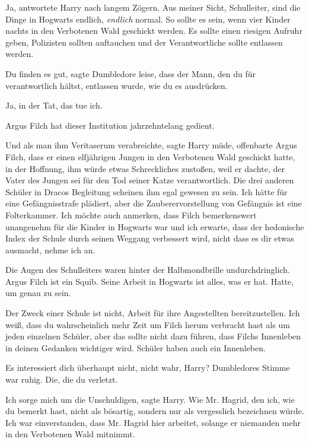 \glqq{}Ja\grqq{}, antwortete Harry nach langem Zögern. \glqq{}Aus meiner Sicht,
Schulleiter, sind die Dinge in Hogwarts endlich, \emph{endlich} normal. So
sollte es sein, wenn vier Kinder nachts in den Verbotenen Wald geschickt werden.
Es sollte einen riesigen Aufruhr geben, Polizisten sollten auftauchen und der
Verantwortliche sollte entlassen werden.\grqq{}

\glqq{}Du finden es gut\grqq{}, sagte Dumbledore leise, \glqq{}dass der Mann, den
du für verantwortlich hältst, entlassen wurde, wie du es ausdrücken.\grqq{}

\glqq{}Ja, in der Tat, das tue ich.\grqq{}

\glqq{}Argus Filch hat dieser Institution jahrzehntelang gedient.\grqq{}

\glqq{}Und als man ihm Veritaserum verabreichte\grqq{}, sagte Harry müde, \glqq{}
offenbarte Argus Filch, dass er einen elfjährigen Jungen in den Verbotenen Wald
geschickt hatte, in der Hoffnung, ihm würde etwas Schreckliches zustoßen, weil
er dachte, der Vater des Jungen sei für den Tod seiner Katze verantwortlich. Die
drei anderen Schüler in Dracos Begleitung scheinen ihm egal gewesen zu sein. Ich
hätte für eine Gefängnisstrafe plädiert, aber die Zauberervorstellung von
Gefängnis ist eine Folterkammer. Ich möchte auch anmerken, dass Filch
bemerkenswert unangenehm für die Kinder in Hogwarts war und ich erwarte, dass
der hedonische Index der Schule durch seinen Weggang verbessert wird, nicht dass
es dir etwas ausmacht, nehme ich an.\grqq{}

Die Augen des Schulleiters waren hinter der Halbmondbrille undurchdringlich.
\glqq{}Argus Filch ist ein Squib. Seine Arbeit in Hogwarts ist alles, was er hat.
Hatte, um genau zu sein.\grqq{}

\glqq{}Der Zweck einer Schule ist nicht, Arbeit für ihre Angestellten
bereitzustellen. Ich weiß, dass du wahrscheinlich mehr Zeit um Filch herum
verbracht hast als um jeden einzelnen Schüler, aber das sollte nicht dazu
führen, dass Filchs Innenleben in deinen Gedanken wichtiger wird. Schüler haben
auch ein Innenleben.\grqq{}

\glqq{}Es interessiert dich überhaupt nicht, nicht wahr, Harry?\grqq{}
Dumbledores Stimme war ruhig. \glqq{}Die, die du verletzt.\grqq{}

\glqq{}Ich sorge mich um die Unschuldigen\grqq{}, sagte Harry. \glqq{}Wie Mr.
Hagrid, den ich, wie du bemerkt hast, nicht als bösartig, sondern nur als
vergesslich bezeichnen würde. Ich war einverstanden, dass Mr. Hagrid hier
arbeitet, solange er niemanden mehr in den Verbotenen Wald mitnimmt.\grqq{}

